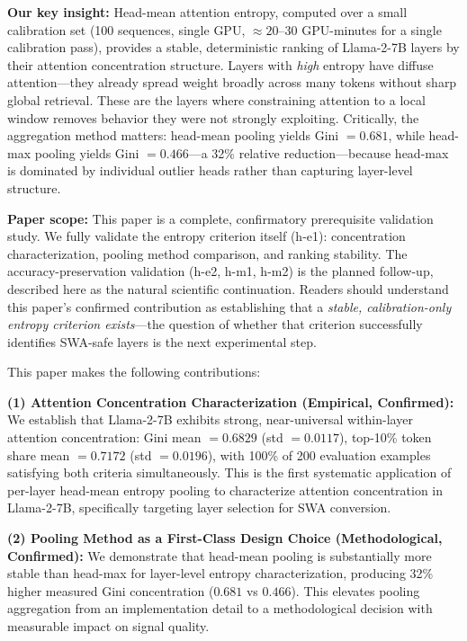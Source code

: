 \textbf{Our key insight:} Head-mean attention entropy, computed over a small calibration set (100 sequences, single GPU, $\approx 20$--30 GPU-minutes for a single calibration pass), provides a stable, deterministic ranking of Llama-2-7B layers by their attention concentration structure. Layers with \emph{high} entropy have diffuse attention---they already spread weight broadly across many tokens without sharp global retrieval. These are the layers where constraining attention to a local window removes behavior they were not strongly exploiting. Critically, the aggregation method matters: head-mean pooling yields Gini $= 0.681$, while head-max pooling yields Gini $= 0.466$---a 32\% relative reduction---because head-max is dominated by individual outlier heads rather than capturing layer-level structure.

\textbf{Paper scope:} This paper is a complete, confirmatory prerequisite validation study. We fully validate the entropy criterion itself (h-e1): concentration characterization, pooling method comparison, and ranking stability. The accuracy-preservation validation (h-e2, h-m1, h-m2) is the planned follow-up, described here as the natural scientific continuation. Readers should understand this paper's confirmed contribution as establishing that a \emph{stable, calibration-only entropy criterion exists}---the question of whether that criterion successfully identifies SWA-safe layers is the next experimental step.

This paper makes the following contributions:

\textbf{(1) Attention Concentration Characterization (Empirical, Confirmed):} We establish that Llama-2-7B exhibits strong, near-universal within-layer attention concentration: Gini mean $= 0.6829$ (std $= 0.0117$), top-10\% token share mean $= 0.7172$ (std $= 0.0196$), with 100\% of 200 evaluation examples satisfying both criteria simultaneously. This is the first systematic application of per-layer head-mean entropy pooling to characterize attention concentration in Llama-2-7B, specifically targeting layer selection for SWA conversion.

\textbf{(2) Pooling Method as a First-Class Design Choice (Methodological, Confirmed):} We demonstrate that head-mean pooling is substantially more stable than head-max for layer-level entropy characterization, producing 32\% higher measured Gini concentration ($0.681$ vs $0.466$). This elevates pooling aggregation from an implementation detail to a methodological decision with measurable impact on signal quality.

